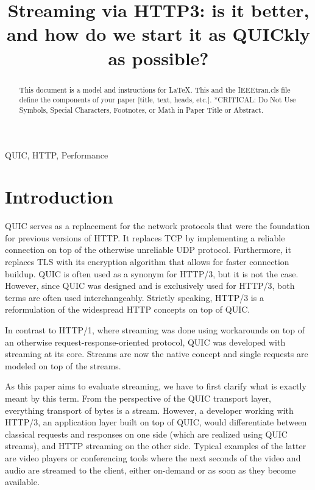 \documentclass[conference]{IEEEtran}
\begin{document}
\title{Streaming via HTTP3: is it better, and how do we start it as QUICkly as possible?}

\author{
}

\maketitle

\begin{abstract}
This document is a model and instructions for \LaTeX.
This and the IEEEtran.cls file define the components of your paper [title, text, heads, etc.]. *CRITICAL: Do Not Use Symbols, Special Characters, Footnotes, 
or Math in Paper Title or Abstract.
\end{abstract}

\begin{IEEEkeywords}
QUIC, HTTP, Performance
\end{IEEEkeywords}

\section{Introduction}

QUIC serves as a replacement for the network protocols that were the foundation for previous versions of HTTP. It replaces TCP by implementing a reliable connection on top of the otherwise unreliable UDP protocol. Furthermore, it replaces TLS with its encryption algorithm that allows for faster connection buildup. QUIC is often used as a synonym for HTTP/3, but it is not the case. However, since QUIC was designed and is exclusively used for HTTP/3, both terms are often used interchangeably. Strictly speaking, HTTP/3 is a reformulation of the widespread HTTP concepts on top of QUIC.

In contrast to HTTP/1, where streaming was done using workarounds on top of an otherwise request-response-oriented protocol, QUIC was developed with streaming at its core. Streams are now the native concept and single requests are modeled on top of the streams.

As this paper aims to evaluate streaming, we have to first clarify what is exactly meant by this term. From the perspective of the QUIC transport layer, everything transport of bytes is a stream. However, a developer working with HTTP/3, an application layer built on top of QUIC, would differentiate between classical requests and responses on one side (which are realized using QUIC streams), and HTTP streaming on the other side. Typical examples of the latter are video players or conferencing tools where the next seconds of the video and audio are streamed to the client, either on-demand or as soon as they become available.
\end{document}
